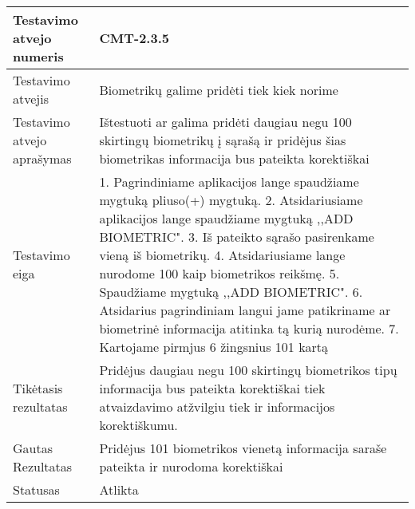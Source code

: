\documentclass[oneside]{VUMIFPSkursinis}
\begin{document}
\begin{center}
    \begin{tabular}{ |p{5cm}|p{13cm}|}
    \hline
        Testavimo atvejo numeris & CMT-2.3.5  \\ \hline
        Testavimo atvejis & Biometrikų galime pridėti tiek kiek norime  \\ \hline
        Testavimo atvejo aprašymas & Ištestuoti ar galima pridėti daugiau negu 100 skirtingų biometrikų į sąrašą ir pridėjus šias biometrikas informacija bus pateikta korektiškai \\ \hline
        Testavimo eiga &  1. Pagrindiniame aplikacijos lange spaudžiame mygtuką pliuso(+) mygtuką. 
				2. Atsidariusiame aplikacijos lange spaudžiame mygtuką ,,ADD BIOMETRIC". 
				3. Iš pateikto sąrašo pasirenkame vieną iš biometrikų. 
				4. Atsidariusiame lange nurodome 100 kaip biometrikos reikšmę.
				5. Spaudžiame mygtuką ,,ADD BIOMETRIC".
				6. Atsidarius pagrindiniam langui jame patikriname ar biometrinė informacija atitinka tą kurią nurodėme.
				7. Kartojame pirmjus 6 žingsnius 101 kartą \\ \hline
        Tikėtasis rezultatas & Pridėjus daugiau negu 100 skirtingų biometrikos tipų informacija bus pateikta korektiškai tiek atvaizdavimo atžvilgiu tiek ir informacijos korektiškumu.\\ \hline
        Gautas Rezultatas & Pridėjus 101 biometrikos vienetą informacija saraše pateikta ir nurodoma korektiškai  \\ \hline
        Statusas & Atlikta  \\ \hline
    \hline
    \end{tabular}
\end{center}
\end{document}

